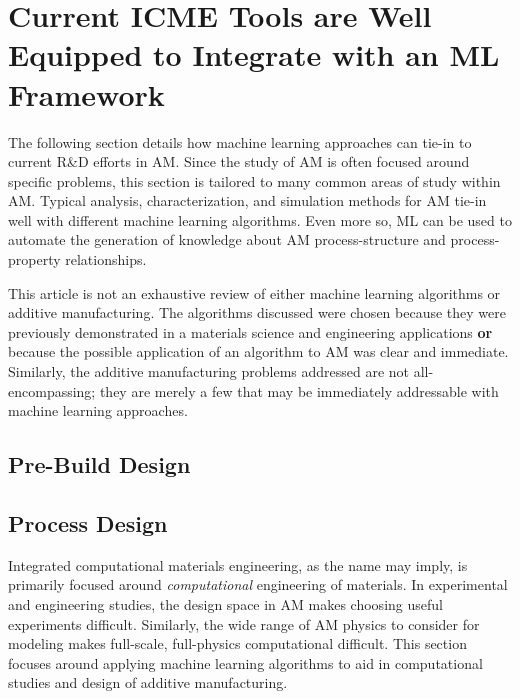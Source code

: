 \section{Current ICME Tools are Well Equipped to Integrate with an ML Framework}
The following section details how machine learning approaches can tie-in to current R\&D efforts in AM. Since the study of AM is often focused around specific problems, this section is tailored to many common areas of study within AM. Typical analysis, characterization, and simulation methods for AM tie-in well with different machine learning algorithms. Even more so, ML can be used to automate the generation of knowledge about AM process-structure and process-property relationships. 

This article is not an exhaustive review of either machine learning algorithms or additive manufacturing. The algorithms discussed were chosen because they were previously demonstrated in a materials science and engineering applications \textbf{or} because the possible application of an algorithm to AM was clear and immediate. Similarly, the additive manufacturing problems addressed are not all-encompassing; they are merely a few that may be immediately addressable with machine learning approaches. 

\subsection{Pre-Build Design}




\subsection{Process Design}
Integrated computational materials engineering, as the name may imply, is primarily focused around \textit{computational} engineering of materials. In experimental and engineering studies, the design space in AM makes choosing useful experiments difficult. Similarly, the wide range of AM physics to consider for modeling makes full-scale, full-physics computational difficult. This section focuses around applying machine learning algorithms to aid in computational studies and design of additive manufacturing. 




